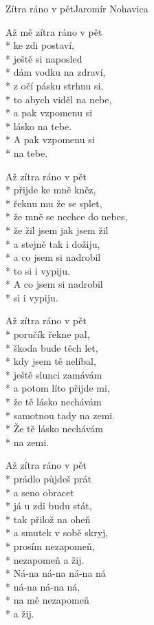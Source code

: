 \documentclass[10.5pt]{book}
\begin{document}
\begin{poem}{Zítra ráno v pět}{Jaromír Nohavica}

\settowidth{\versewidth}{že mně se nechce do nebes,}

Až mě zítra ráno v pět\\*
ke zdi postaví,\\*
ještě si naposled\\*
dám vodku na zdraví,\\*
z očí pásku strhnu si,\\*
to abych viděl na nebe,\\*
a pak vzpomenu si\\*
lásko na tebe.\\*
A pak vzpomenu si\\*
na tebe.

Až zítra ráno v pět\\*
přijde ke mně kněz,\\*
řeknu mu že se splet,\\*
že mně se nechce do nebes,\\*
že žil jsem jak jsem žil\\*
a stejně tak i dožiju,\\*
a co jsem si nadrobil\\*
to si i vypiju.\\*
A co jsem si nadrobil\\*
si i vypiju.

\vfill\eject

Až zítra ráno v pět\\*
poručík řekne pal,\\*
škoda bude těch let,\\*
kdy jsem tě nelíbal,\\*
ještě slunci zamávám\\*
a potom líto přijde mi,\\*
že tě lásko nechávám\\*
samotnou tady na zemi.\\*
Že tě lásko nechávám\\*
na zemi.

Až zítra ráno v pět\\*
prádlo půjdeš prát\\*
a seno obracet\\*
já u  zdi budu stát,\\*
tak přilož na oheň\\*
a smutek v sobě skryj,\\*
prosím nezapomeň,\\*
nezapomeň a žij.\\*
Ná-na ná-na ná-na ná\\*
ná-na ná-na ná,\\*
na mě nezapomeň\\*
a žij.

\end{poem}
\end{document}

